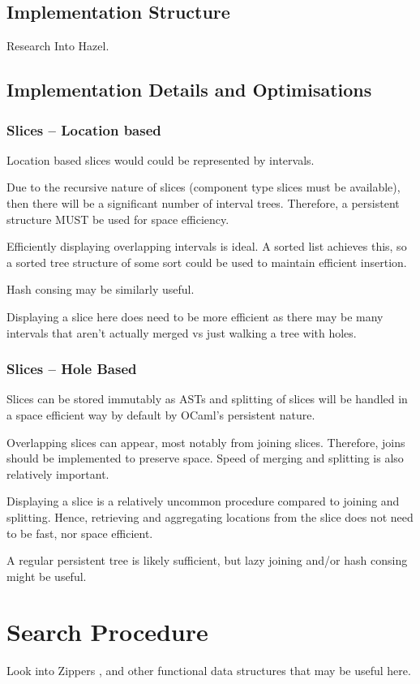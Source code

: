 \subsection{Implementation Structure}
Research Into Hazel.

\subsection{Implementation Details and Optimisations}
\subsubsection{Slices -- Location based}
Location based slices would could be represented by intervals.\par 
Due to the recursive nature of slices (component type slices must be available), then there will be a significant number of interval trees. Therefore, a persistent structure \cite[chapter~2]{PurelyFunctionalDataStructures} MUST be used for space efficiency.\par 
Efficiently displaying overlapping intervals is ideal. A sorted list achieves this, so a sorted  tree structure of some sort could be used to maintain efficient insertion.\par 
Hash consing may be similarly useful.\par 
Displaying a slice here does need to be more efficient as there may be many intervals that aren't actually merged vs just walking a tree with holes.


\subsubsection{Slices -- Hole Based}
Slices can be stored immutably as ASTs and splitting of slices will be handled in a space efficient way by default by OCaml's persistent nature.\par 
Overlapping slices can appear, most notably from joining slices. Therefore, joins should be implemented to preserve space. Speed of merging and splitting is also relatively important.\par 
Displaying a slice is a relatively uncommon procedure compared to joining and splitting. Hence, retrieving and aggregating locations from the slice does not need to be fast, nor space efficient. \par 
A regular persistent tree is likely sufficient, but lazy joining and/or hash consing \cite{HashCons} might be useful.


\section{Search Procedure}
Look into Zippers \cite{Zipper}, and other functional data structures that may be useful here.

